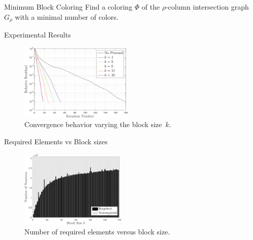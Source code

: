 \documentclass{beamer}
\newcommand{\sparsifysymbol}{\ensuremath{\rho}}
\begin{document}
\begin{frame}{Minimum Block Coloring}
Find a coloring $\Phi$ of the $\sparsifysymbol$-column intersection graph
$G_\sparsifysymbol$ with a minimal number of colors.
\end{frame}

\begin{frame}{Experimental Results}

\begin{figure}
\centering
\includegraphics[width=0.48\textwidth]{convergence}
\caption{Convergence behavior varying the block size~$k$.}
\label{f:convergence}
\end{figure}

\end{frame}

\begin{frame}{Required Elements vs Block sizes}
\begin{figure}
\centering
\includegraphics[width=0.45\textwidth]{nnz_bar_required_elements}
\caption{Number of required elements versus block size.}
\label{f:required_elements}
\end{figure}
\end{frame}
\end{document}
